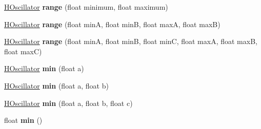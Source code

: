 \begin{DoxyCompactItemize}
\item 
\hypertarget{classhype_1_1extended_1_1behavior_1_1_h_oscillator_a105cbf527e45b81bd25f26e827c5f409}{\hyperlink{classhype_1_1extended_1_1behavior_1_1_h_oscillator}{H\-Oscillator} {\bfseries range} (float minimum, float maximum)}\label{classhype_1_1extended_1_1behavior_1_1_h_oscillator_a105cbf527e45b81bd25f26e827c5f409}

\item 
\hypertarget{classhype_1_1extended_1_1behavior_1_1_h_oscillator_a82a6adf7aaaa8f153c0150ade0d05674}{\hyperlink{classhype_1_1extended_1_1behavior_1_1_h_oscillator}{H\-Oscillator} {\bfseries range} (float min\-A, float min\-B, float max\-A, float max\-B)}\label{classhype_1_1extended_1_1behavior_1_1_h_oscillator_a82a6adf7aaaa8f153c0150ade0d05674}

\item 
\hypertarget{classhype_1_1extended_1_1behavior_1_1_h_oscillator_afb72e1eee00543b6747ece3e10303d75}{\hyperlink{classhype_1_1extended_1_1behavior_1_1_h_oscillator}{H\-Oscillator} {\bfseries range} (float min\-A, float min\-B, float min\-C, float max\-A, float max\-B, float max\-C)}\label{classhype_1_1extended_1_1behavior_1_1_h_oscillator_afb72e1eee00543b6747ece3e10303d75}

\item 
\hypertarget{classhype_1_1extended_1_1behavior_1_1_h_oscillator_a4b7f4e79c8f6f9cedc238389d40b85cb}{\hyperlink{classhype_1_1extended_1_1behavior_1_1_h_oscillator}{H\-Oscillator} {\bfseries min} (float a)}\label{classhype_1_1extended_1_1behavior_1_1_h_oscillator_a4b7f4e79c8f6f9cedc238389d40b85cb}

\item 
\hypertarget{classhype_1_1extended_1_1behavior_1_1_h_oscillator_a5d6aec06e312a4041097584a0f19dd4e}{\hyperlink{classhype_1_1extended_1_1behavior_1_1_h_oscillator}{H\-Oscillator} {\bfseries min} (float a, float b)}\label{classhype_1_1extended_1_1behavior_1_1_h_oscillator_a5d6aec06e312a4041097584a0f19dd4e}

\item 
\hypertarget{classhype_1_1extended_1_1behavior_1_1_h_oscillator_a9923361376e0e201ff5427a9e79f1585}{\hyperlink{classhype_1_1extended_1_1behavior_1_1_h_oscillator}{H\-Oscillator} {\bfseries min} (float a, float b, float c)}\label{classhype_1_1extended_1_1behavior_1_1_h_oscillator_a9923361376e0e201ff5427a9e79f1585}

\item 
\hypertarget{classhype_1_1extended_1_1behavior_1_1_h_oscillator_aa7ca3fe006360554a8f890d670910d86}{float {\bfseries min} ()}\label{classhype_1_1extended_1_1behavior_1_1_h_oscillator_aa7ca3fe006360554a8f890d670910d86}


\end{DoxyCompactItemize}
